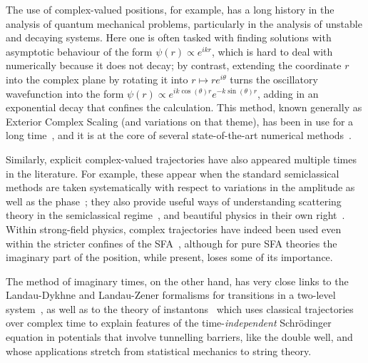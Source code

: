 The use of complex-valued positions, for example, has a long history in the analysis of quantum mechanical problems, particularly in the analysis of unstable and decaying systems. Here one is often tasked with finding solutions with asymptotic behaviour of the form $\psi(r)\propto e^{i kr}$, which is hard to deal with numerically because it does not decay; by contrast, extending the coordinate $r$ into the complex plane by rotating it into $r\mapsto re^{i\theta}$ turns the oscillatory wavefunction into the form $\psi(r) \propto e^{ik\cos(\theta)r} e^{-k\sin(\theta)r}$, adding in an exponential decay that confines the calculation. This method, known generally as Exterior Complex Scaling (and variations on that theme), has been in use for a long time~\cite{reinhardt_complex-coords_1982}, and it is at the core of several state-of-the-art numerical methods~\cite{scrinzi_TDSE_chapter, scrinzi_tsurff_2012}. 

Similarly, explicit complex-valued trajectories have also appeared multiple times in the literature. For example, these appear when the standard semiclassical methods are taken systematically with respect to variations in the amplitude as well as the phase~\cite{goldfarb-tannor_bohmian-complex_2006, goldfarb-tannor_complex-trajectory-wkb_2008, schiff-tannor_path-integral-complex-trajectory_2011}; they also provide useful ways of understanding scattering theory in the semiclassical regime~\cite{ miller_semiclassical-collisions_1972, pechukas_analytic_1976, hwang_adiabatic_1977}, and beautiful physics in their own right~\cite{anderson_complex-classical-trajectories_2012}. Within strong-field physics, complex trajectories have indeed been used even within the stricter confines of the SFA~\cite{salieres_quantum_orbits, kopold_quantum-orbits_2002, milosevic_quantum-orbit_2006}, although for pure SFA theories the imaginary part of the position, while present, loses some of its importance.




The method of imaginary times, on the other hand, has very close links to the Landau-Dykhne and Landau-Zener formalisms for transitions in a two-level system~\cite{landau_QM, dykhne_adiabatic_1962, wittig_landau-zener_2005}, as well as to the theory of instantons~\cite{zinn_instantons_1987} which uses classical trajectories over complex time to explain features of the time-\textit{independent} Schrödinger equation in potentials that involve tunnelling barriers, like the double well, and whose applications stretch from statistical mechanics to string theory.


